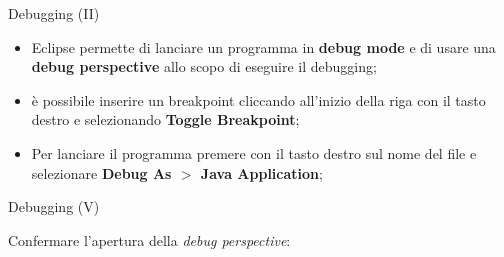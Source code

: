 \begin{frame}{Debugging (II)}

  \begin{itemize}
   \item Eclipse permette di lanciare un programma in \textbf{debug mode} e di usare una \textbf{debug perspective}
   allo scopo di eseguire il debugging;
   \item è possibile inserire un breakpoint cliccando all'inizio della riga con il tasto destro e selezionando
   \textbf{Toggle Breakpoint};
  \end{itemize}
  
  \begin{center}
  \end{center}

  \begin{itemize}
   \item Per lanciare il programma premere con il tasto destro sul nome del file e selezionare
   \textbf{Debug As $>$ Java Application};
  \end{itemize}

\end{frame}

{
  
}

\begin{frame}{Debugging (V)}

  Confermare l'apertura della \emph{debug perspective}:
  \begin{center}
  \end{center}

\end{frame}

{
  
}

{
  
}

{
  
}

